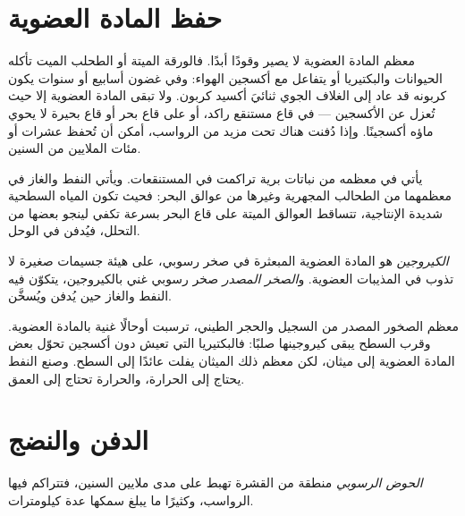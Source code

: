 \section{حفظ المادة العضوية}

معظم المادة العضوية لا يصير وقودًا أبدًا. فالورقة الميتة أو الطحلب الميت
تأكله الحيوانات والبكتيريا أو يتفاعل مع أكسجين الهواء: وفي غضون
أسابيع أو سنوات يكون كربونه قد عاد إلى الغلاف الجوي ثنائيَ أكسيد كربون.
ولا تبقى المادة العضوية إلا حيث تُعزل عن الأكسجين --- في
قاع مستنقع راكد، أو على قاع بحر أو قاع بحيرة لا يحوي ماؤه
أكسجينًا. وإذا دُفنت هناك تحت مزيد من الرواسب، أمكن أن تُحفظ عشرات أو
مئات الملايين من السنين.

يأتي  في معظمه من نباتات برية تراكمت في المستنقعات. ويأتي النفط والغاز
في معظمهما من الطحالب المجهرية وغيرها من عوالق البحر: فحيث تكون
المياه السطحية شديدة الإنتاجية، تتساقط العوالق الميتة على قاع البحر
بسرعة تكفي لينجو بعضها من التحلل، فيُدفن في الوحل.

\begin{definition}\label{def:g11:fossil-fuel-geology:source-rock}
\emph{الكيروجين} هو المادة العضوية المبعثرة في
صخر رسوبي، على هيئة جسيمات صغيرة لا تذوب في المذيبات
العضوية. و\emph{الصخر المصدر} صخر رسوبي غني
بالكيروجين، يتكوّن فيه النفط والغاز حين يُدفن ويُسخَّن.
\end{definition}

معظم الصخور المصدر من السجيل والحجر الطيني، ترسبت أوحالًا غنية
بالمادة العضوية. وقرب السطح يبقى كيروجينها صلبًا: فالبكتيريا التي تعيش
دون أكسجين تحوّل بعض المادة العضوية إلى ميثان، لكن معظم
ذلك الميثان يفلت عائدًا إلى السطح. وصنع النفط يحتاج إلى الحرارة، والحرارة تحتاج إلى العمق.

\section{الدفن والنضج}

\begin{definition}\label{def:g11:fossil-fuel-geology:basin}
\emph{الحوض الرسوبي} منطقة من القشرة
تهبط على مدى ملايين السنين، فتتراكم فيها الرواسب، وكثيرًا ما يبلغ سمكها
عدة كيلومترات.
\end{definition}

